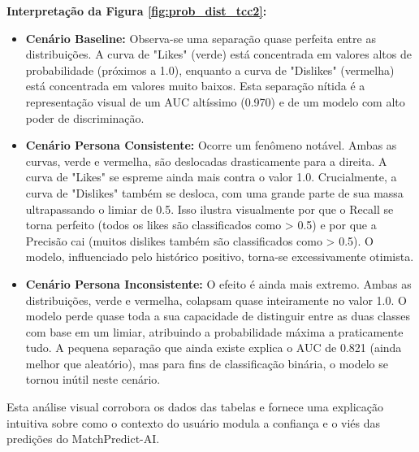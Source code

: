 \textbf{Interpretação da Figura \ref{fig:prob_dist_tcc2}:}
\begin{itemize}
    \item \textbf{Cenário Baseline:} Observa-se uma separação quase perfeita entre as distribuições. A curva de "Likes" (verde) está concentrada em valores altos de probabilidade (próximos a 1.0), enquanto a curva de "Dislikes" (vermelha) está concentrada em valores muito baixos. Esta separação nítida é a representação visual de um AUC altíssimo (0.970) e de um modelo com alto poder de discriminação.
    
    \item \textbf{Cenário Persona Consistente:} Ocorre um fenômeno notável. Ambas as curvas, verde e vermelha, são deslocadas drasticamente para a direita. A curva de "Likes" se espreme ainda mais contra o valor 1.0. Crucialmente, a curva de "Dislikes" também se desloca, com uma grande parte de sua massa ultrapassando o limiar de 0.5. Isso ilustra visualmente por que o Recall se torna perfeito (todos os likes são classificados como > 0.5) e por que a Precisão cai (muitos dislikes também são classificados como > 0.5). O modelo, influenciado pelo histórico positivo, torna-se excessivamente otimista.

    \item \textbf{Cenário Persona Inconsistente:} O efeito é ainda mais extremo. Ambas as distribuições, verde e vermelha, colapsam quase inteiramente no valor 1.0. O modelo perde quase toda a sua capacidade de distinguir entre as duas classes com base em um limiar, atribuindo a probabilidade máxima a praticamente tudo. A pequena separação que ainda existe explica o AUC de 0.821 (ainda melhor que aleatório), mas para fins de classificação binária, o modelo se tornou inútil neste cenário.
\end{itemize}
Esta análise visual corrobora os dados das tabelas e fornece uma explicação intuitiva sobre como o contexto do usuário modula a confiança e o viés das predições do MatchPredict-AI.